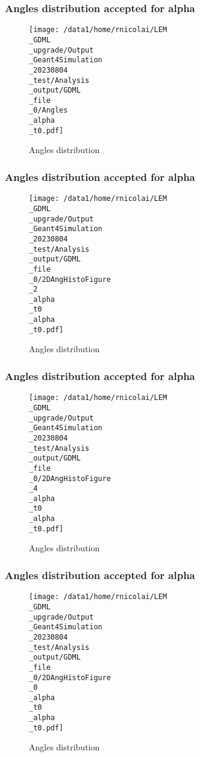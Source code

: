 \documentclass[8pt]{beamer}
\begin{document}
            \begin{frame}
                \frametitle{Angles distribution accepted for alpha}
            
        \begin{figure}[h]
            \centering
            \texttt{[image: /data1/home/rnicolai/LEM\\\_GDML\\\_upgrade/Output\\\_Geant4Simulation\\\_20230804\\\_test/Analysis\\\_output/GDML\\\_file\\\_0/Angles\\\_alpha\\\_t0.pdf]}
            \caption{Angles distribution}
        \end{figure}
        
            \end{frame}
            
            \begin{frame}
                \frametitle{Angles distribution accepted for alpha}
            
        \begin{figure}[h]
            \centering
            \texttt{[image: /data1/home/rnicolai/LEM\\\_GDML\\\_upgrade/Output\\\_Geant4Simulation\\\_20230804\\\_test/Analysis\\\_output/GDML\\\_file\\\_0/2DAngHistoFigure\\\_2\\\_alpha\\\_t0\\\_alpha\\\_t0.pdf]}
            \caption{Angles distribution}
        \end{figure}
        
            \end{frame}
            
            \begin{frame}
                \frametitle{Angles distribution accepted for alpha}
            
        \begin{figure}[h]
            \centering
            \texttt{[image: /data1/home/rnicolai/LEM\\\_GDML\\\_upgrade/Output\\\_Geant4Simulation\\\_20230804\\\_test/Analysis\\\_output/GDML\\\_file\\\_0/2DAngHistoFigure\\\_4\\\_alpha\\\_t0\\\_alpha\\\_t0.pdf]}
            \caption{Angles distribution}
        \end{figure}
        
            \end{frame}
            
            \begin{frame}
                \frametitle{Angles distribution accepted for alpha}
            
        \begin{figure}[h]
            \centering
            \texttt{[image: /data1/home/rnicolai/LEM\\\_GDML\\\_upgrade/Output\\\_Geant4Simulation\\\_20230804\\\_test/Analysis\\\_output/GDML\\\_file\\\_0/2DAngHistoFigure\\\_0\\\_alpha\\\_t0\\\_alpha\\\_t0.pdf]}
            \caption{Angles distribution}
        \end{figure}
        
            \end{frame}
            
\end{document}
